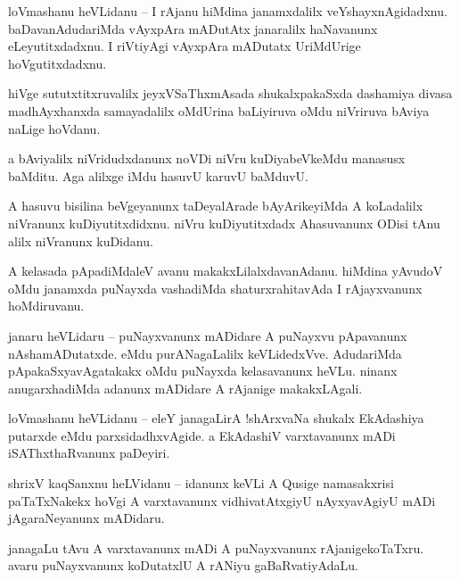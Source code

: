 \documentclass{article}
\begin{document}
\begin{mn}%
loVmashanu heVLidanu -- I rAjanu hiMdina janamxdalilx veYshayxnAgidadxnu. baDavanAdudariMda 
vAyxpAra mADutAtx janaralilx haNavanunx eLeyutitxdadxnu. I riVtiyAgi vAyxpAra mADutatx UriMdUrige 
hoVgutitxdadxnu.
\end{mn}

\begin{mn}%
hiVge sututxtitxruvalilx jeyxVSaThxmAsada shukalxpakaSxda dashamiya divasa madhAyxhanxda 
samayadalilx oMdUrina baLiyiruva oMdu niVriruva bAviya naLige hoVdanu.
\end{mn}

\begin{mn}%
a bAviyalilx niVridudxdanunx noVDi niVru kuDiyabeVkeMdu manasusx baMditu. Aga alilxge iMdu hasuvU 
karuvU baMduvU.
\end{mn}

\begin{mn}%
A hasuvu bisilina beVgeyanunx taDeyalArade bAyArikeyiMda A koLadalilx niVranunx kuDiyutitxdidxnu. 
niVru kuDiyutitxdadx Ahasuvanunx ODisi tAnu alilx niVranunx kuDidanu.
\end{mn}

\begin{mn}%
A kelasada pApadiMdaleV avanu makakxLilalxdavanAdanu. hiMdina yAvudoV oMdu janamxda puNayxda 
vashadiMda shaturxrahitavAda I rAjayxvanunx hoMdiruvanu.
\end{mn}

\begin{mn}%
janaru heVLidaru -- puNayxvanunx mADidare A puNayxvu pApavanunx nAshamADutatxde. eMdu 
purANagaLalilx keVLidedxVve. AdudariMda pApakaSxyavAgatakakx oMdu puNayxda kelasavanunx heVLu. 
ninanx anugarxhadiMda adanunx mADidare A rAjanige makakxLAgali.
\end{mn}

\begin{mn}%
loVmashanu heVLidanu -- eleY janagaLirA !shArxvaNa shukalx EkAdashiya putarxde eMdu 
parxsidadhxvAgide. a EkAdashiV varxtavanunx mADi iSAThxthaRvanunx paDeyiri.
\end{mn}

\begin{mn}%
shrixV kaqSanxnu heLVidanu -- idanunx keVLi A Qusige namasakxrisi paTaTxNakekx hoVgi A varxtavanunx 
vidhivatAtxgiyU nAyxyavAgiyU mADi jAgaraNeyanunx mADidaru.
\end{mn}

\begin{mn}%
janagaLu tAvu A varxtavanunx mADi A puNayxvanunx rAjanigekoTaTxru. avaru puNayxvanunx koDutatxlU A 
rANiyu gaBaRvatiyAdaLu.
\end{mn}
\end{document}
